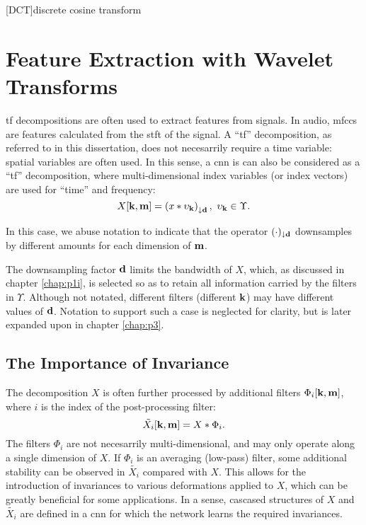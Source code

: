[DCT]{discrete cosine transform}

\chapter{Feature Extraction with Wavelet Transforms}
\label{chap:p2i}

\ac{tf} decompositions are often used to extract features from signals. In audio, \acp{mfcc} are features calculated from the \ac{stft} of the signal. A ``\ac{tf}'' decomposition, as referred to in this dissertation, does not necesarrily require a time variable: spatial variables are often used. In this sense, a \ac{cnn} is can also be considered as a ``\ac{tf}'' decomposition, where multi-dimensional index variables (or index vectors) are used for ``time'' and frequency:
\begin{equation}
    X[\vect{k}, \vect{m}] = \left( x * \upsilon_{\vect{k}} \right)_{\downarrow \vect{d}}, \ \upsilon_{\vect{k}} \in \Upsilon.
\end{equation}

In this case, we abuse notation to indicate that the operator $(\cdot)_{\downarrow \boldsymbol{\mathbf{d}}}$ downsamples by different amounts for each dimension of $\boldsymbol{\mathbf{m}}$. 

The downsampling factor $\boldsymbol{\mathbf{d}}$ limits the bandwidth of $X$, which, as discussed in chapter \ref{chap:p1i}, is selected so as to retain all information carried by the filters in $\Upsilon$. Although not notated, different filters (different $\boldsymbol{\mathbf{k}}$) may have different values of $\boldsymbol{\mathbf{d}}$. Notation to support such a case is neglected for clarity, but is later expanded upon in chapter \ref{chap:p3}.

\section{The Importance of Invariance}

The decomposition $X$ is often further processed by additional filters $\Phi_i[\boldsymbol{\mathbf{k}}, \boldsymbol{\mathbf{m}}]$, where $i$ is the index of the post-processing filter:
\begin{equation}
    \tilde{X_i}[\boldsymbol{\mathbf{k}}, \boldsymbol{\mathbf{m}}] = X * \Phi_i.
\end{equation}
The filters $\Phi_i$ are not necesarrily multi-dimensional, and may only operate along a single dimension of $X$. If $\Phi_i$ is an averaging (low-pass) filter, some additional stability can be observed in $\tilde{X_i}$ compared with $X$. This allows for the introduction of invariances to various deformations applied to $X$, which can be greatly beneficial for some applications. In a sense, cascased structures of $X$ and $\tilde{X_i}$ are defined in a \ac{cnn} for which the network learns the required invariances.

